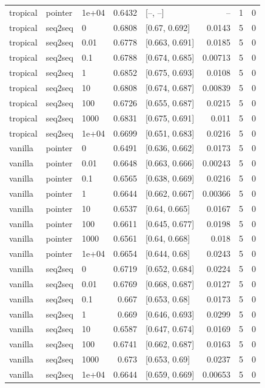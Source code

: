 \documentclass[10pt]{article}
\begin{document}
{\begin{longtable}{lllrlrrr}
tropical & pointer & 1e+04 & 0.6432 & [--, --] & -- & 1 & 0\\
tropical & seq2seq & 0 & 0.6808 & [0.67, 0.692] & 0.0143 & 5 & 0\\
tropical & seq2seq & 0.01 & 0.6778 & [0.663, 0.691] & 0.0185 & 5 & 0\\
tropical & seq2seq & 0.1 & 0.6788 & [0.674, 0.685] & 0.00713 & 5 & 0\\
tropical & seq2seq & 1 & 0.6852 & [0.675, 0.693] & 0.0108 & 5 & 0\\
tropical & seq2seq & 10 & 0.6808 & [0.674, 0.687] & 0.00839 & 5 & 0\\
tropical & seq2seq & 100 & 0.6726 & [0.655, 0.687] & 0.0215 & 5 & 0\\
tropical & seq2seq & 1000 & 0.6831 & [0.675, 0.691] & 0.011 & 5 & 0\\
tropical & seq2seq & 1e+04 & 0.6699 & [0.651, 0.683] & 0.0216 & 5 & 0\\
vanilla & pointer & 0 & 0.6491 & [0.636, 0.662] & 0.0173 & 5 & 0\\
vanilla & pointer & 0.01 & 0.6648 & [0.663, 0.666] & 0.00243 & 5 & 0\\
vanilla & pointer & 0.1 & 0.6565 & [0.638, 0.669] & 0.0216 & 5 & 0\\
vanilla & pointer & 1 & 0.6644 & [0.662, 0.667] & 0.00366 & 5 & 0\\
vanilla & pointer & 10 & 0.6537 & [0.64, 0.665] & 0.0167 & 5 & 0\\
vanilla & pointer & 100 & 0.6611 & [0.645, 0.677] & 0.0198 & 5 & 0\\
vanilla & pointer & 1000 & 0.6561 & [0.64, 0.668] & 0.018 & 5 & 0\\
vanilla & pointer & 1e+04 & 0.6654 & [0.644, 0.68] & 0.0243 & 5 & 0\\
vanilla & seq2seq & 0 & 0.6719 & [0.652, 0.684] & 0.0224 & 5 & 0\\
vanilla & seq2seq & 0.01 & 0.6769 & [0.668, 0.687] & 0.0127 & 5 & 0\\
vanilla & seq2seq & 0.1 & 0.667 & [0.653, 0.68] & 0.0173 & 5 & 0\\
vanilla & seq2seq & 1 & 0.669 & [0.646, 0.693] & 0.0299 & 5 & 0\\
vanilla & seq2seq & 10 & 0.6587 & [0.647, 0.674] & 0.0169 & 5 & 0\\
vanilla & seq2seq & 100 & 0.6741 & [0.662, 0.687] & 0.0163 & 5 & 0\\
vanilla & seq2seq & 1000 & 0.673 & [0.653, 0.69] & 0.0237 & 5 & 0\\
vanilla & seq2seq & 1e+04 & 0.6644 & [0.659, 0.669] & 0.00653 & 5 & 0\\
\bottomrule
\end{longtable}
}
\end{document}
